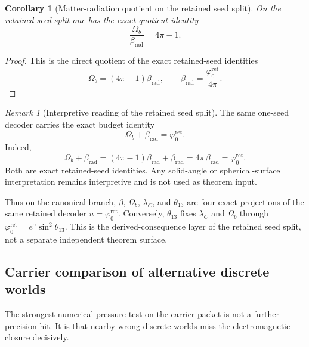 \documentclass[11pt,a4paper]{article}
\newtheorem{corollary}[theorem]{Corollary}
\theoremstyle{definition}
\theoremstyle{remark}
\newtheorem*{remark}{Remark}
\newcommand{\phiz}{\varphi_0^{\mathrm{ret}}}
\begin{document}
\begin{corollary}[Matter-radiation quotient on the retained seed split]
\label{cor:matter-radiation-quotient}
On the retained seed split one has the exact quotient identity
\[
\frac{\Omega_b}{\beta_{\mathrm{rad}}}=4\pi-1.
\]
\end{corollary}

\begin{proof}
This is the direct quotient of the exact retained-seed identities
\[
\Omega_b=(4\pi-1)\beta_{\mathrm{rad}},
\qquad
\beta_{\mathrm{rad}}=\frac{\phiz}{4\pi}.
\]
\end{proof}

\begin{remark}[Interpretive reading of the retained seed split]
The same one-seed decoder carries the exact budget identity
\begin{equation}
\label{eq:seed-budget-identity}
\Omega_b+\beta_{\mathrm{rad}}=\phiz.
\end{equation}
Indeed,
\[
\Omega_b+\beta_{\mathrm{rad}}
=(4\pi-1)\beta_{\mathrm{rad}}+\beta_{\mathrm{rad}}
=4\pi\,\beta_{\mathrm{rad}}
=\phiz.
\]
Both  are exact retained-seed
identities. Any solid-angle or spherical-surface interpretation remains interpretive and is not
used as theorem input.
\end{remark}

Thus on the canonical branch, $\beta$, $\Omega_b$, $\lambda_C$, and $\theta_{13}$ are four exact
projections of the same retained decoder $u=\phiz$. Conversely, $\theta_{13}$ fixes $\lambda_C$ and
$\Omega_b$ through $\phiz=e^\gamma\sin^2\theta_{13}$. This is the derived-consequence layer of the
retained seed split, not a separate independent theorem surface.

\subsection{Carrier comparison of alternative discrete worlds}

The strongest numerical pressure test on the carrier packet is not a further precision hit. It is
that nearby wrong discrete worlds miss the electromagnetic closure decisively.
\end{document}
